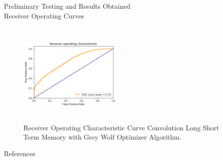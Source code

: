 \documentclass{beamer}
\begin{document}
\begin{frame}{Preliminary Testing and Results Obtained\\ \footnotesize{Receiver Operating Curves}}
    \begin{figure}[h]
    \centerline{\includegraphics[width=2in,height=2in]{lstm-batalgorithm3.png}}
    \caption{Receiver Operating Characteristic Curve Convolution Long Short Term Memory with Grey Wolf Optimizer Algorithm.}
    \end{figure}
    
\end{frame}



\begin{frame}[allowframebreaks]{References}

\nocite{*}
\end{frame}
\end{document}
